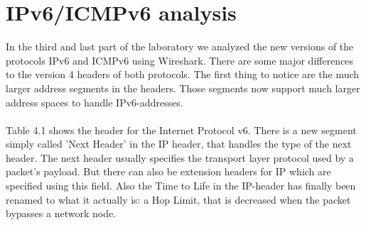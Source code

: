 \chapter{IPv6/ICMPv6 analysis}
\label{ipv6}
In the third and last part of the laboratory we analyzed the new versions of the protocols IPv6 and ICMPv6 using Wireshark. There are some major differences to the version 4 headers of both protocols. The first thing to notice are the much larger address segments in the headers. Those segments now support much larger address spaces to handle IPv6-addresses. 
\\\\
Table 4.1 shows the header for the Internet Protocol v6.
There is a new segment simply called 'Next Header' in the IP header, that handles the type of the next header. The next header usually specifies the transport layer protocol used by a packet's payload. But there can also be extension headers for IP which are specified using this field.
Also the Time to Life in the IP-header has finally been renamed to what it actually is: a Hop Limit, that is decreased when the packet bypasses a network node. 

